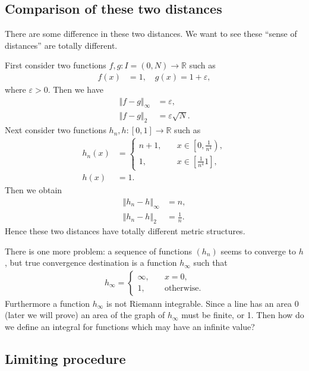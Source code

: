 \documentclass[openany, a4paper, oneside]{jsbook}
\theoremstyle{break}
\theoremstyle{breakdefn}
\newcommand{\norm}[1]{\left\Vert#1\right\Vert}
\newcommand{\sqbk}[1]{\left[#1\right]}
\newcommand{\bbR}{\mathbb{R}}
\begin{document}
\subsection{Comparison of these two distances}


There are some difference in these two distances.
We want to see these ``sense of distances'' are totally different.

First consider two functions $f,g \colon I = (0, N) \to \bbR$ such as
\begin{align}
 f (x)
 &=
 1, \quad
 g (x)
 =
 1 + \varepsilon,
\end{align}
where $\varepsilon > 0$.
Then we have
\begin{align}
 \norm{f - g}_{\infty}
 &=
 \varepsilon, \\
 \norm{f - g}_{2}
 &=
 \varepsilon \sqrt{N}.
\end{align}
Next consider two functions $h_n, h \colon [0, 1] \to \bbR$ such as
\begin{align}
 h_n (x)
 &=
 \begin{cases}
  n+1, \quad &x \in \left[0, \frac{1}{n^4} \right), \\
  1, \quad &x \in \sqbk{\frac{1}{n^4} 1},
 \end{cases} \\
 h (x)
 &= 1.
\end{align}
Then we obtain
\begin{align}
 \norm{h_n - h}_{\infty}
 &=
 n, \\
 \norm{h_n - h}_2
 &=
 \frac{1}{n}.
\end{align}
Hence these two distances have totally different metric structures.

There is one more problem: a sequence of functions $(h_n)$ seems to converge to $h$,
but true convergence destination is a function $h_{\infty}$ such that
\begin{align}
 h_{\infty}
 =
 \begin{cases}
  \infty, \quad &x = 0, \\
  1, \quad &\text{otherwise}.
 \end{cases}
\end{align}
Furthermore a function $h_{\infty}$ is not Riemann integrable.
Since a line has an area 0 (later we will prove) an area of the graph of $h_{\infty}$ must be finite, or 1.
Then how do we define an integral for functions which may have an infinite value?
\subsection{Limiting procedure}
\end{document}
